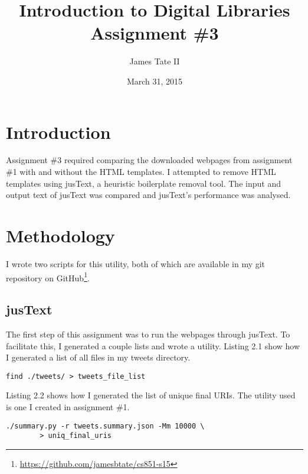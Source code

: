 \documentclass[a4paper,12pt]{article}
\begin{document}
\renewcommand{\thelstlisting}{\thesection-\arabic{lstlisting}}
\renewcommand{\thefigure}{\arabic{section}-\arabic{figure}}
\setlength{\floatsep}{0pt plus 2pt minus 2pt}

\title{Introduction to Digital Libraries Assignment \#3}
\date{March 31, 2015}
\author{James Tate II}
\maketitle

\section{Introduction}
Assignment \#3 required comparing the downloaded webpages from assignment \#1 with and without the HTML
templates\cite{hw1}.
I attempted to remove HTML templates using jusText, a heuristic boilerplate removal tool\cite{justext}. The input
and output text of jusText was compared and jusText's performance was analysed.

\section{Methodology}
I wrote two scripts for this utility, both of which are available in my git repository on
GitHub\footnote{\url{https://github.com/jamesbtate/cs851-s15}}.

\subsection{jusText}
The first step of this assignment was to run the webpages through jusText. To facilitate this, I generated a couple
lists and wrote a utility. Listing 2.1 show how I generated a list of all files in my tweets directory.

\begin{lstlisting}[basicstyle=\ttfamily,caption={Generating list of files in tweets directory}]
    find ./tweets/ > tweets_file_list
\end{lstlisting}

Listing 2.2 shows how I generated the list of unique final URIs. The utility used is one I created in assignment
\#1.

\begin{lstlisting}[basicstyle=\ttfamily,caption={Generating list of unique final URIs}]
    ./summary.py -r tweets.summary.json -Mm 10000 \
        > uniq_final_uris
\end{lstlisting}
\end{document}
